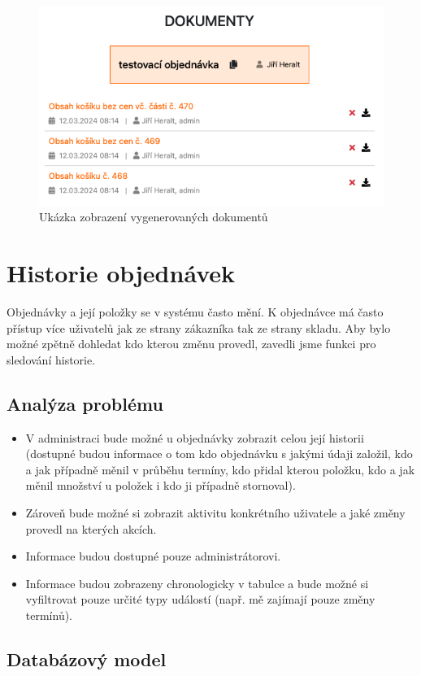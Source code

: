 \begin{figure}
    \centering
    \includegraphics[width=0.5\linewidth]{Figures/karta-dokumenty.png}
    \caption{Ukázka zobrazení vygenerovaných dokumentů}
    \label{fig:enter-label}
\end{figure}

\section{Historie objednávek}

Objednávky a její položky se v systému často mění. K objednávce má často přístup více uživatelů jak ze strany zákazníka tak ze strany skladu. Aby bylo možné zpětně dohledat kdo kterou změnu provedl, zavedli jsme funkci pro sledování historie. 

\subsection{Analýza problému}

\begin{itemize}
    \item V administraci bude možné u objednávky zobrazit celou její historii (dostupné budou informace o tom kdo objednávku s jakými údaji založil, kdo a jak případně měnil v průběhu termíny, kdo přidal kterou položku, kdo a jak měnil množství u položek i kdo ji případně stornoval).
    \item Zároveň bude možné si zobrazit aktivitu konkrétního uživatele a jaké změny provedl na kterých akcích.
    \item Informace budou dostupné pouze administrátorovi.
    \item Informace budou zobrazeny chronologicky v tabulce a bude možné si vyfiltrovat pouze určité typy událostí (např. mě zajímají pouze změny termínů).
\end{itemize}

\subsection{Databázový model}

